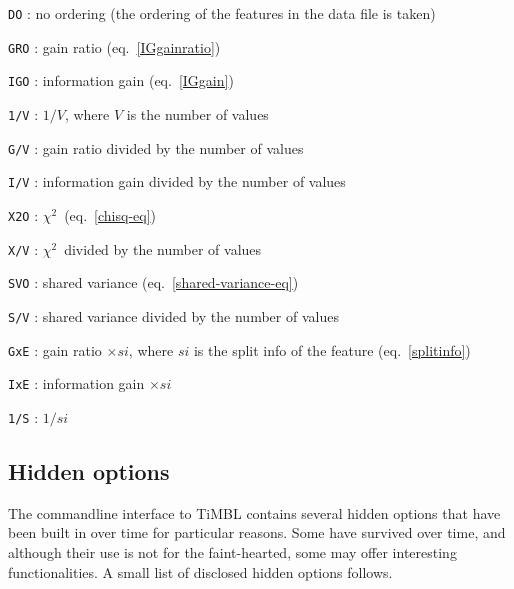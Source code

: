 \documentclass{book}
\newcommand{\chisq}{{$ \chi^2 $}}
\begin{document}
\begin{description}
	\begin{description}
         \item {\tt DO} : no ordering (the ordering of the features in
           the data file is taken)
         \item {\tt GRO} : gain ratio (eq.~\ref{IGgainratio})
         \item {\tt IGO} : information gain (eq.~\ref{IGgain})
         \item {\tt 1/V} : $1/V$, where $V$ is the number of values
         \item {\tt G/V} : gain ratio divided by the number of values
         \item {\tt I/V} : information gain divided by the number of
           values
         \item {\tt X2O} : \chisq \ (eq.~\ref{chisq-eq})
         \item {\tt X/V} : \chisq \ divided by the number of values
         \item {\tt SVO} : shared variance
           (eq.~\ref{shared-variance-eq})
         \item {\tt S/V} : shared variance divided by the number of
           values
         \item {\tt GxE} : gain ratio $\times si$, where $si$ is the
           split info of the feature (eq.~\ref{splitinfo})
         \item {\tt IxE} : information gain $\times si$
         \item {\tt 1/S} : $1/si$
	\end{description}

\end{description}

\subsection{Hidden options}

The commandline interface to TiMBL contains several hidden options
that have been built in over time for particular reasons. Some have
survived over time, and although their use is not for the
faint-hearted, some may offer interesting functionalities. A small
list of disclosed hidden options follows.
\end{document}
